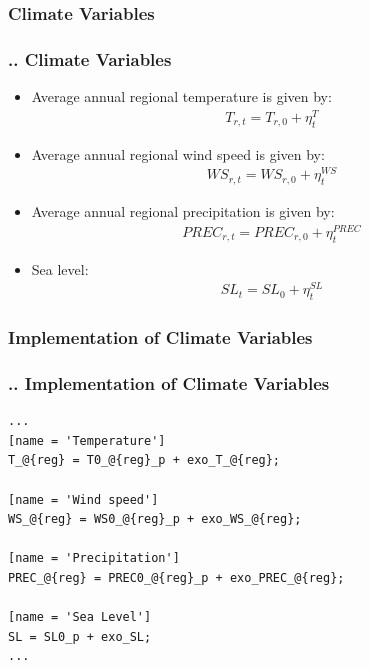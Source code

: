 \documentclass[11pt,aspectratio=169]{beamer}
\begin{document}
\subsubsection{Climate Variables}
\begin{frame}
\frametitle{{\thesection.\thesubsection.\thesubsubsection} Climate Variables}
\scriptsize
\begin{itemize}
\item Average annual regional temperature is given by:
\begin{align*}
T_{r,t} = T_{r,0} + \eta^{T}_{t}
\end{align*}
\item Average annual regional wind speed is given by:
\begin{align*}
WS_{r,t} = WS_{r,0} + \eta^{WS}_{t}
\end{align*}
\item Average annual regional precipitation is given by:
\begin{align*}
PREC_{r,t} = PREC_{r,0} + \eta^{PREC}_{t}
\end{align*}

\item Sea level:
\begin{align*}
SL_{t} = SL_{0} + \eta^{SL}_{t}
\end{align*}
\end{itemize}
\end{frame}

\subsubsection{Implementation of Climate Variables}
\begin{frame}[fragile]
\frametitle{{\thesection.\thesubsection.\thesubsubsection} Implementation of Climate Variables}

\begin{lstlisting}[frame = single]
...
[name = 'Temperature']
T_@{reg} = T0_@{reg}_p + exo_T_@{reg};

[name = 'Wind speed']
WS_@{reg} = WS0_@{reg}_p + exo_WS_@{reg};

[name = 'Precipitation']
PREC_@{reg} = PREC0_@{reg}_p + exo_PREC_@{reg};

[name = 'Sea Level']
SL = SL0_p + exo_SL;
...
\end{lstlisting}
\end{frame}
\end{document}

